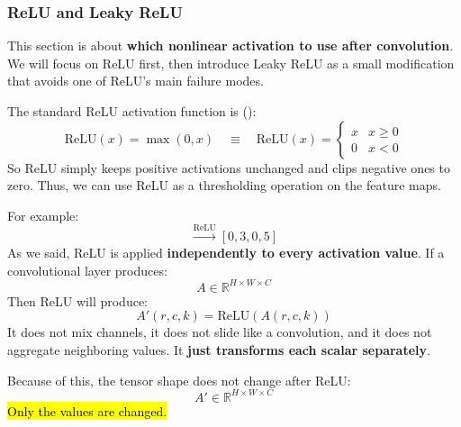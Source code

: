 \subsubsection{ReLU and Leaky ReLU}\label{sec:relu-and-leaky-relu-cnn}

This section is about \textbf{which nonlinear activation to use after convolution}. We will focus on ReLU first, then introduce Leaky ReLU as a small modification that avoids one of ReLU's main failure modes.

\highspace
The standard ReLU activation function is ():
\begin{equation*}
    \mathrm{ReLU}(x) = \max(0, x) \quad \equiv \quad \mathrm{ReLU}(x) = \begin{cases}
        x & x \geq 0 \\
        0 & x < 0
    \end{cases}
\end{equation*}
So ReLU simply keeps positive activations unchanged and clips negative ones to zero. Thus, we can use ReLU as a thresholding operation on the feature maps.

\highspace
For example:
\begin{equation*}
    [-2, 3, -1, 5] \xrightarrow{\mathrm{ReLU}} [0, 3, 0, 5]
\end{equation*}
As we said, ReLU is applied \textbf{independently to every activation value}. If a convolutional layer produces:
\begin{equation*}
    A \in \mathbb{R}^{H \times W \times C}
\end{equation*}
Then ReLU will produce:
\begin{equation*}
    A'(r,c,k) = \mathrm{ReLU}(A(r,c,k))
\end{equation*}
It does not mix channels, it does not slide like a convolution, and it does not aggregate neighboring values. It \textbf{just transforms each scalar separately}.

\highspace
Because of this, the tensor shape does not change after ReLU:
\begin{equation*}
    A' \in \mathbb{R}^{H \times W \times C}
\end{equation*}
\hl{Only the values are changed.}

